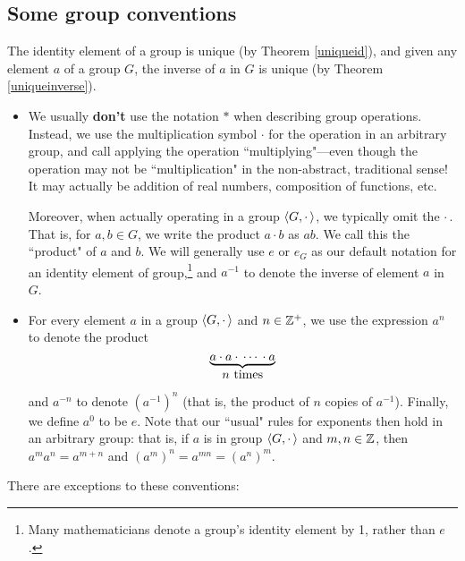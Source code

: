 \subsection{Some group conventions}
\smallskip

\begin{thm}\label{} The identity element of a group is
unique (by Theorem \ref{uniqueid}), and given any element $a$
of a group $G$, the inverse of $a$ in $G$ is unique (by Theorem
\ref{uniqueinverse}).\end{thm}


\begin{itemize}
\item
We usually \textbf{don't} use the notation $*$ when describing group
operations. Instead, we use the multiplication symbol $\cdot$ for
the operation in an arbitrary group, and  call
    applying the operation ``multiplying"---even though the operation may
not be ``multiplication" in the non-abstract, traditional sense! It may
    actually be addition of real numbers, composition of
    functions, etc.


Moreover, when actually operating in a group $\langle G, \cdot\,\rangle$, we
typically omit the $\cdot$\,. That is, for $a,b\in G$, we write the
product $a\cdot b$ as $ab$. We call this the ``product" of $a$ and $b$. We will generally use $e$
or $e_G$ as our default notation for an identity element of group,\footnote{Many mathematicians denote a group's identity element by 1, rather than $e$.} and $a^{-1}$ to denote the inverse of element $a$ in $G$.

\bigskip
{}

\item For every element $a$ in a group $\langle G, \cdot\,\rangle$ and $n\in \mathbb{Z}^+$, we use the expression $a^n$ to denote  the product
$$\stackrel{\underbrace{a\cdot a \cdot \,\cdots \,\cdot a}}{n \mbox{ \rm times}}$$ and $a^{-n}$ to denote $(a^{-1})^n$ (that is, the product of $n$ copies of $a^{-1}$).
Finally, we define $a^0$ to be $e$.  Note that our ``usual" rules for exponents then hold in an arbitrary group: that is, if $a$ is in group $\langle G, \cdot\,\rangle$
and $m,n\in \mathbb{Z}$, then $a^m a^n = a^{m+n}$ and $(a^m)^n=a^{mn}=(a^n)^m$.

\end{itemize}
\noindent
There are exceptions to these conventions:

